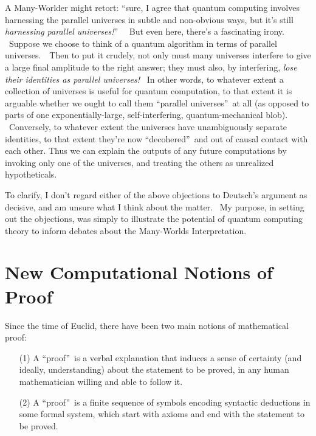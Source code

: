 \documentclass[12pt,onecolumn]{article}%
\begin{document}
A Many-Worlder might retort: \textquotedblleft sure, I agree that quantum
computing involves harnessing the parallel universes in subtle and non-obvious
ways, but it's still \textit{harnessing parallel universes!}\textquotedblright%
\ \ But even here, there's a fascinating irony. \ Suppose we choose to think
of a quantum algorithm in terms of parallel universes.\ \ Then to put it
crudely, not only must many universes interfere to give a large final
amplitude to the right answer; they must also, by interfering, \textit{lose
their identities as parallel universes!} \ In other words, to whatever extent
a collection of universes is useful for quantum computation, to that extent it
is arguable whether we ought to call them \textquotedblleft parallel
universes\textquotedblright\ at all (as opposed to parts of one
exponentially-large, self-interfering, quantum-mechanical blob). \ Conversely,
to whatever extent the universes have unambiguously separate identities, to
that extent they're now \textquotedblleft decohered\textquotedblright\ and out
of causal contact with each other. Thus we can explain the outputs of any
future computations by invoking only one of the universes, and treating the
others as unrealized hypotheticals.

To clarify, I don't regard either of the above objections to Deutsch's
argument as decisive, and am unsure what I think about the matter. \ My
purpose, in setting out the objections, was simply to illustrate the potential
of quantum computing theory to inform debates about the Many-Worlds Interpretation.

\section{New Computational Notions of Proof\label{PROOF}}

Since the time of Euclid, there have been two main notions of mathematical proof:

\begin{enumerate}
\item[(1)] A \textquotedblleft proof\textquotedblright\ is a verbal
explanation that induces a sense of certainty (and ideally, understanding)
about the statement to be proved, in any human mathematician willing and able
to follow it.

\item[(2)] A \textquotedblleft proof\textquotedblright\ is a finite sequence
of symbols encoding syntactic deductions in some formal system, which start
with axioms and end with the statement to be proved.
\end{enumerate}
\end{document}
